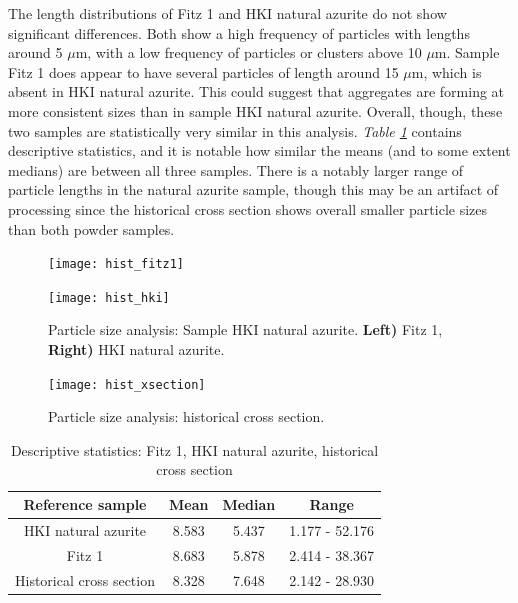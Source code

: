 The length distributions of Fitz 1 and HKI natural azurite do not show significant differences. Both show a high frequency of particles with lengths around 5 $\mu$m, with a low frequency of particles or clusters above 10 $\mu$m. Sample Fitz 1 does appear to have several particles of length around 15 $\mu$m, which is absent in HKI natural azurite. This could suggest that aggregates are forming at more consistent sizes than in sample HKI natural azurite. Overall, though, these two samples are statistically very similar in this analysis. \textit{Table \ref{table:r_stats}} contains descriptive statistics, and it is notable how similar the means (and to some extent medians) are between all three samples. There is a notably larger range of particle lengths in the natural azurite sample, though this may be an artifact of processing since the historical cross section shows overall smaller particle sizes than both powder samples. 

\begin{figure}[H]
\centering
\begin{minipage}{.45\textwidth}
  \centering
  \texttt{[image: hist\_fitz1]}
\end{minipage}
\begin{minipage}{.45\textwidth}
  \centering
  \texttt{[image: hist\_hki]}
\end{minipage}
\caption[Particle size analysis: HKI natural azurite, Fitz 1]{Particle size analysis: Sample HKI natural azurite. \textbf{Left)} Fitz 1, \textbf{Right)} HKI natural azurite.}
\label{fig:histogram_length}
\end{figure}

\begin{figure}[H]
\centering
  \texttt{[image: hist\_xsection]}
\caption[Particle size analysis: historical cross section]{Particle size analysis: historical cross section.} 
\label{fig:hist_xsec}
\end{figure}

\begin{table}[H]
\caption{Descriptive statistics: Fitz 1, HKI natural azurite, historical cross section}
\centering
\label{table:r_stats}
\begin{tabular}{c c c c}
\toprule
Reference sample & Mean & Median & Range \\
\midrule
HKI natural azurite & 8.583 & 5.437 & 1.177 - 52.176 \\
Fitz 1 & 8.683 & 5.878 & 2.414 - 38.367 \\
Historical cross section & 8.328 & 7.648 & 2.142 - 28.930 \\
\bottomrule
\end{tabular}
\end{table}

